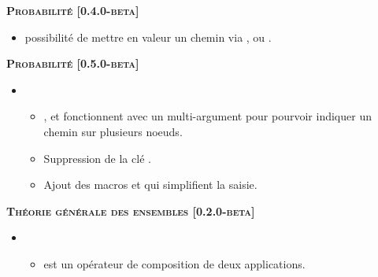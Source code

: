 \documentclass[12pt,a4paper]{book}
\begin{document}
\begin{description}
\begin{itemize}[itemsep=.5em]
    
    \end{itemize}
    
    
    \separation
    
    
    
    
    \begin{center}
        \textbf{\textsc{Probabilité [0.4.0-beta]}}
    \end{center}
    
    \begin{itemize}[itemsep=.5em]
        \item {}
        	  possibilité de mettre en valeur un chemin via ,   ou .
    \end{itemize}
    
    
    \begin{center}
        \textbf{\textsc{Probabilité [0.5.0-beta]}}
    \end{center}
    
    \begin{itemize}[itemsep=.5em]
        \item {}
        \begin{itemize}[itemsep=.5em]
            \item {},  et  fonctionnent avec un multi-argument pour pourvoir indiquer un chemin sur plusieurs noeuds.
            
            \item Suppression de la clé .
            
            \item Ajout des macros  et  qui simplifient la saisie.
        \end{itemize}
    \end{itemize}
    
    
    \separation
    
    
    
    
    \begin{center}
        \textbf{\textsc{Théorie générale des ensembles [0.2.0-beta]}}
    \end{center}
    
    \begin{itemize}[itemsep=.5em]
        \item {}
        \begin{itemize}[itemsep=.5em]
            \item {} est un opérateur de composition de deux applications.
    

\end{itemize}
\end{itemize}
\end{description}
\end{document}
